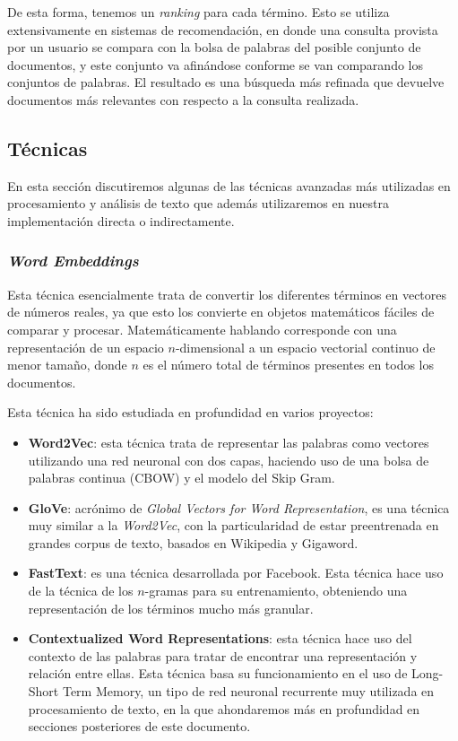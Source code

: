 De esta forma, tenemos un \textit{ranking} para cada término. Esto se utiliza extensivamente en sistemas de recomendación, en donde una consulta provista por un usuario se compara con la bolsa de palabras del posible conjunto de documentos, y este conjunto va afinándose conforme se van comparando los conjuntos de palabras. El resultado es una búsqueda más refinada que devuelve documentos más relevantes con respecto a la consulta realizada.


\subsection{Técnicas}
En esta sección discutiremos algunas de las técnicas avanzadas más utilizadas en procesamiento y análisis de texto que además utilizaremos en nuestra implementación directa o indirectamente.

\subsubsection{\textit{Word Embeddings}}
Esta técnica esencialmente trata de convertir los diferentes términos en vectores de números reales, ya que esto los convierte en objetos matemáticos fáciles de comparar y procesar. Matemáticamente hablando corresponde con una representación de un espacio $n$-dimensional a un espacio vectorial continuo de menor tamaño, donde $n$ es el número total de términos presentes en todos los documentos.

Esta técnica ha sido estudiada en profundidad en varios proyectos:

\begin{itemize}
    \item \textbf{Word2Vec}: esta técnica trata de representar las palabras como vectores utilizando una red neuronal con dos capas, haciendo uso de una bolsa de palabras continua (CBOW) y el modelo del Skip Gram. \cite{Mikolov2013Word2Vec}
    \item \textbf{GloVe}: acrónimo de \textit{Global Vectors for Word Representation}, es una técnica muy similar a la \textit{Word2Vec}, con la particularidad de estar preentrenada en grandes corpus de texto, basados en Wikipedia y Gigaword. \cite{Pennington2014GloveGV}
    \item \textbf{FastText}: es una técnica desarrollada por Facebook. Esta técnica hace uso de la técnica de los $n$-gramas para su entrenamiento, obteniendo una representación de los términos mucho más granular. \cite{Bojanowski2017EnrichingWV}
    \item \textbf{Contextualized Word Representations}: esta técnica hace uso del contexto de las palabras para tratar de encontrar una representación y relación entre ellas. Esta técnica basa su funcionamiento en el uso de Long-Short Term Memory, un tipo de red neuronal recurrente muy utilizada en procesamiento de texto, en la que ahondaremos más en profundidad en secciones posteriores de este documento. \cite{Melamud2016context2vecLG}
\end{itemize}

